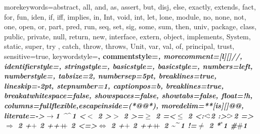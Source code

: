 {morekeywords={abstract, all, and, as, assert, but, disj, else, exactly, extends, fact, for, fun, iden, if, iff, implies, in, Int, void, int, let, lone, module, no, none, not, one, open, or, part, pred, run, seq, set, sig, some, sum, then, univ, package, class, public, private, null, return, new, interface, extern, object, implements, System, static, super, try , catch, throw, throws, Unit, var, val, of, principal, trust},
sensitive=true,
keywordstyle=\bfseries\color{\stlccol}, %
commentstyle=\itshape\color{purple!40!black},
morecomment=[l][\small\itshape\color{purple!40!black}]{//},
identifierstyle=\color{\stlccol},
stringstyle=\color{orange},
basicstyle=\small,
basicstyle={\small\ttfamily},
numbers=left,
numberstyle=\tiny\color{mygray},
tabsize=2,
numbersep=5pt,
breaklines=true,
lineskip=-2pt,
stepnumber=1,
captionpos=b,
breaklines=true,
breakatwhitespace=false,
showspaces=false,
showtabs=false,
float=!h,
columns=fullflexible,escapeinside={(*@}{@*)},
moredelim=**[is][\color{red!60}]{@}{@},
literate={->}{{$\to$}}1 {^}{{$\mspace{-3mu}\widehat{\quad}\mspace{-3mu}$}}1
{<}{$<$ }2 {>}{$>$ }2 {>=}{$\geq$ }2 {=<}{$\leq$ }2
{<:}{{$<\mspace{-3mu}:$}}2 {:>}{{$:\mspace{-3mu}>$}}2
{=>}{{$\Rightarrow$ }}2 {+}{$+$ }2 {++}{{$+\mspace{-8mu}+$ }}2
{<=>}{{$\Leftrightarrow$ }}2 {+}{$+$ }2 {++}{{$+\mspace{-8mu}+$ }}2
{\~}{{$\mspace{-3mu}\widetilde{\quad}\mspace{-3mu}$}}1
{!=}{$\neq$ }2 {*}{${}^{\ast}$}1 %
{\#}{$\#$}1
}

